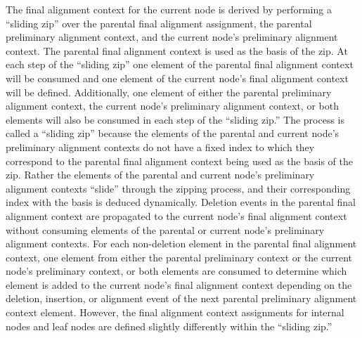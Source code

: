 \documentclass[11pt]{article}
\begin{document}
The final alignment context for the current node is derived by performing a ``sliding zip'' over the parental final alignment assignment, the parental preliminary alignment context, and the current node's preliminary alignment context.
The parental final alignment context is used as the basis of the zip.
At each step of the ``sliding zip'' one element of the parental final alignment context will be consumed and one element of the current node's final alignment context will be defined.
Additionally, one element of either the parental preliminary alignment context, the current node's preliminary alignment context, or both elements will also be consumed in each step of the ``sliding zip.''
The process is called a ``sliding zip'' because the elements of the parental and current node's preliminary alignment contexts do not have a fixed index to which they correspond to the parental final alignment context being used as the basis of the zip.
Rather the elements of the parental and current node's preliminary alignment contexts ``slide'' through the zipping process, and their corresponding index with the basis is deduced dynamically.
Deletion events in the parental final alignment context are propagated to the current node's final alignment context without consuming elements of the parental or current node's preliminary alignment contexts.
For each non-deletion element in the parental final alignment context, one element from either the parental preliminary context or the current node's preliminary context, or both elements are consumed to determine which element is added to the current node's final alignment context depending on the deletion, insertion, or alignment event of the next parental preliminary alignment context element.
However, the final alignment context assignments for internal nodes and leaf nodes are defined slightly differently within the ``sliding zip.''
\end{document}
